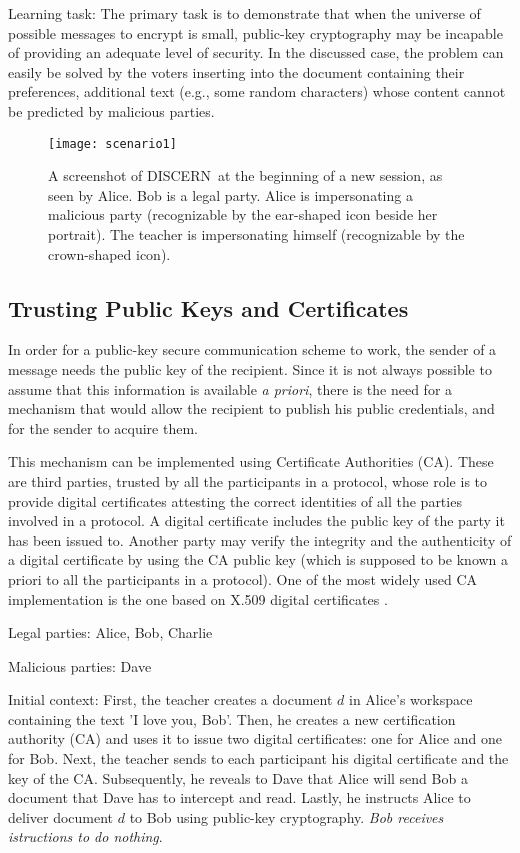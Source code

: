 \documentclass[10pt,conference]{IEEEtran}
\def\disgrace{DISCERN}
\begin{document}
{\sc Learning task:} The primary task is to demonstrate that
when the universe of possible messages to encrypt is small,
public-key cryptography may be incapable of providing an adequate
level of security. In the discussed case, the problem can easily
be solved by the voters inserting into the document
containing their preferences, additional text
(e.g., some random characters) whose content cannot be predicted by malicious parties.

\begin{figure*}
\centering
\texttt{[image: scenario1]}
\caption{A screenshot of \disgrace\ at the beginning of a new session, as seen by Alice. Bob is a legal party. Alice is impersonating a malicious party (recognizable by the ear-shaped icon beside her portrait). The teacher is impersonating himself (recognizable by the crown-shaped icon).}
\label{fig:scenario}
\end{figure*}

\subsection{ Trusting Public Keys and Certificates}
In order for a public-key secure communication scheme to work,
the sender of a message needs the public key of the recipient.
Since it is not always possible to assume that this information
is available {\em a priori}, there is the need for a mechanism
that would allow the recipient to publish his public credentials, and
for the sender to acquire them.

This mechanism can be implemented using Certificate Authorities (CA). These
are third parties, trusted by all the participants in a protocol, whose
role is to provide digital certificates attesting the correct
identities of all the parties involved in a protocol. A digital
certificate includes the public key of the party it has been issued
to. Another party may verify the integrity and the authenticity of a
digital certificate by using the CA public key (which is supposed to
be known a priori to all the participants in a protocol). One of the
most widely used CA implementation is the one based
on X.509 digital certificates \cite{x509}. 

{\sc Legal parties:} Alice, Bob, Charlie

{\sc Malicious parties:} Dave

{\sc Initial context:} First, the teacher creates a document $d$
in Alice's workspace containing the text 'I love you, Bob'.
Then, he creates a new certification authority (CA) and uses it to issue
two digital certificates: one for Alice and one for Bob. Next, the
teacher sends to each participant his digital certificate and the key
of the CA.  Subsequently, he reveals
to Dave that Alice will send Bob a document that Dave has to
intercept and read. Lastly, he instructs Alice to deliver
document $d$ to Bob using public-key cryptography. {\em Bob receives
istructions to do nothing}. 
\end{document}
